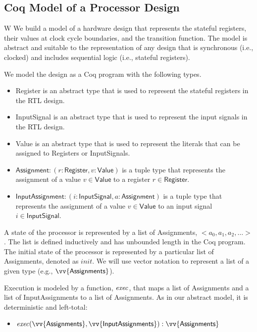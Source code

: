 \subsection{Coq Model of a Processor Design}W
We build a model of a hardware design that represents the stateful
registers, their values at clock cycle boundaries, and the transition
function. The model is abstract and suitable to the representation of any design
that is synchronous (i.e., clocked) and includes sequential logic (i.e.,
stateful registers).

We model the design as a Coq program with the following types.
\begin{itemize}
\item \textsf{Register} is an abstract type that is used to represent the
  stateful registers in the RTL design.
\item \textsf{InputSignal} is an abstract type that is used to represent the
  input signals in the RTL design.
\item \textsf{Value} is an abstract type that is used to represent the
  literals that can be assigned to \textsf{Register}s or \textsf{InputSignal}s.
\item $\textsf{Assignment} : (r: \textsf{Register}, v: \textsf{Value})$ is a
  tuple type that represents the assignment of a value $v \in \textsf{Value}$
  to a register $r \in \textsf{Register}$.
\item $\textsf{InputAssignment} : (i: \textsf{InputSignal}, a:
  \textsf{Assignment})$ is a tuple type that represents the assignment of a
  value $v \in \textsf{Value}$ to an input signal $i \in \textsf{InputSignal}$.
\end{itemize}

A state of the processor is represented by a list of \textsf{Assignment}s, $<a_0, a_1, a_2,
\ldots>$. The list is defined inductively and has unbounded length in the Coq
program. The initial state of the processor is represented by a particular list
of \textsf{Assignment}s, denoted as $\mathit{init}$. We will use vector notation to
represent a list of a given type (e.g., $\vv{\textsf{Assignments}}$).

Execution is modeled by a function, $\mathit{exec}$, that maps a list of \textsf{Assignment}s and
a list of \textsf{InputAssignment}s to a list of
\textsf{Assignment}s. As in our abstract model, it is deterministic and left-total:

\begin{itemize}
\item $\concexecution (\vv{\textsf{Assignments}},
  \vv{\textsf{InputAssignments}}) : \vv{\textsf{Assignments}}$
\end{itemize}
       
